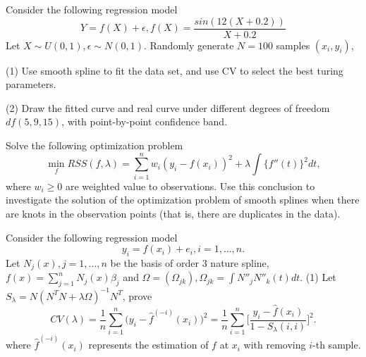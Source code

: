 \begin{problem}[15.1]
    Consider the following regression model
    \begin{equation}
        Y=f(X)+\epsilon,  f(X)=\frac{sin(12(X+0.2))}{X+0.2}
    \end{equation}
    Let $X\sim U(0,1), \epsilon\sim N(0,1)$. Randomly generate $N=100$ samples $(x_i,y_i)$, 

    (1) Use smooth spline to fit the data set, and use CV to select the best turing parameters. 

    (2) Draw the fitted curve and real curve under different degrees of freedom $df (5,9,15)$, with point-by-point confidence band.
\end{problem}

\begin{problem}[15.1]
    Solve the following optimization problem
    \begin{equation}
        \min_f RSS(f,\lambda)=\sum_{i=1}^nw_i(y_i-f(x_i))^2+\lambda\int \{f''(t)\}^2dt,
    \end{equation}
    where $w_i\ge 0$ are weighted value to observations. 
    Use this conclusion to investigate the solution of the optimization problem of smooth splines when there are knots in the observation points (that is, there are duplicates in the data).
\end{problem}

\begin{problem}[16.1]
    Consider the following regression model
    \begin{equation*}
        y_i=f(x_i)+e_i,i=1,\ldots,n.
    \end{equation*}
    Let $N_j(x), j=1,\ldots,n$ be the basis of order $3$ nature spline, $f(x)=\sum_{j=1}^nN_j(x)\beta_j$ and $\Omega=(\Omega_{jk}), \Omega_{jk}=\int N''_jN''_k(t)dt$.
    (1) Let $S_\lambda=N(N^TN+\lambda\Omega)^{-1}N^T$, prove
    \begin{equation*}
        CV(\lambda)=\frac1n\sum_{i=1}^n\Big(y_i-\hat{f}^{(-i)}(x_i)\Big)^2=\frac1n\sum_{i=1}^n\Big[\frac{y_i-\hat{f}(x_i)}{1-S_\lambda(i,i)}\Big]^2.
    \end{equation*}
    where $\hat{f}^{(-i)}(x_i)$ represents the estimation of $f$ at $x_i$ with removing $i$-th sample.
\end{problem}